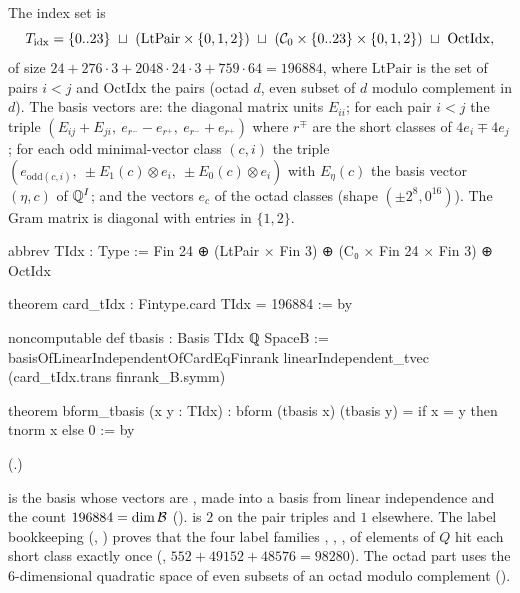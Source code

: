 \begin{definition}\label{ch21:def:tbasis}
The index set is
\begin{equation*}
  T_{\mathrm{idx}}=\{0..23\}\ \sqcup\ (\mathrm{LtPair}\times\{0,1,2\})\ \sqcup\ (\chXXIC_0\times\{0..23\}\times\{0,1,2\})\ \sqcup\ \mathrm{OctIdx},
\end{equation*}
of size $24+276\cdot3+2048\cdot24\cdot3+759\cdot64=196884$, where $\mathrm{LtPair}$ is the set of
pairs $i<j$ and $\mathrm{OctIdx}$ the pairs (octad $d$, even subset of $d$ modulo complement in $d$).
The basis vectors are: the diagonal matrix units $E_{ii}$; for each pair $i<j$ the triple
$(E_{ij}+E_{ji},\ e_{r^-}-e_{r^+},\ e_{r^-}+e_{r^+})$ where $r^\mp$ are the short classes of
$4e_i\mp4e_j$; for each odd minimal-vector class $(c,i)$ the triple $(e_{\mathrm{odd}(c,i)},\ \pm E_1(c)\otimes e_i,\ \pm E_0(c)\otimes e_i)$
with $E_\eta(c)$ the basis vector $(\eta,c)$ of ${\mathbb{Q}}^I$; and the vectors $e_c$ of the octad classes
(shape $(\pm2^8,0^{16})$).  The Gram matrix is diagonal with entries in $\{1,2\}$.
\end{definition}
\begin{leancode}
abbrev TIdx : Type := Fin 24 ⊕ (LtPair × Fin 3) ⊕ (C₀ × Fin 24 × Fin 3) ⊕ OctIdx
\end{leancode}
\begin{leancode}
theorem card_tIdx : Fintype.card TIdx = 196884 := by
\end{leancode}
\begin{leancode}
noncomputable def tbasis : Basis TIdx ℚ SpaceB :=
  basisOfLinearIndependentOfCardEqFinrank linearIndependent_tvec (card_tIdx.trans finrank_B.symm)
\end{leancode}
\begin{leancode}
theorem bform_tbasis (x y : TIdx) : bform (tbasis x) (tbasis y) = if x = y then tnorm x else 0 := by
\end{leancode}
(.)
\begin{dictionary}
 is the basis whose vectors are , made into a basis from linear independence
and the count $196884=\dim\mathcal{B}$ ().   is $2$ on the
pair triples and $1$ elsewhere.  The label bookkeeping (,
) proves that the four label families , ,
,  of elements of $Q$ hit each short class exactly once
(, $552+49152+48576=98280$).  The octad part uses the
$6$-dimensional quadratic space of even subsets of an octad modulo complement
().
\end{dictionary}
